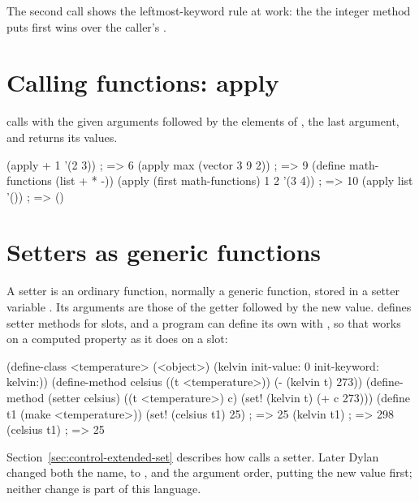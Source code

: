 \noindent The second call shows the leftmost-keyword rule at work: the
 the integer method puts first wins over the caller's
.

\section{Calling functions: apply}\label{sec:functions-apply}

\begin{quote}
\end{quote}

\noindent {} calls  with the given arguments
followed by the elements of , the last argument, and returns
its values.

\begin{dylan}
(apply + 1 '(2 3))             ; => 6
(apply max (vector 3 9 2))     ; => 9
(define math-functions (list + * -))
(apply (first math-functions) 1 2 '(3 4))   ; => 10
(apply list '())               ; => ()
\end{dylan}

\section{Setters as generic functions}\label{sec:functions-setters}

A setter is an ordinary function, normally a generic function, stored in a
setter variable . Its arguments are those of the
getter followed by the new value.  defines setter methods
for slots, and a program can define its own with , so
that  works on a computed property as it does on a slot:

\begin{dylan}
(define-class <temperature> (<object>)
  (kelvin init-value: 0 init-keyword: kelvin:))
(define-method celsius ((t <temperature>))
  (- (kelvin t) 273))
(define-method (setter celsius) ((t <temperature>) c)
  (set! (kelvin t) (+ c 273)))
(define t1 (make <temperature>))
(set! (celsius t1) 25)         ; => 25
(kelvin t1)                    ; => 298
(celsius t1)                   ; => 25
\end{dylan}

\noindent Section~\ref{sec:control-extended-set} describes how 
calls a setter. Later Dylan changed both the name, to ,
and the argument order, putting the new value first; neither change is part
of this language.

